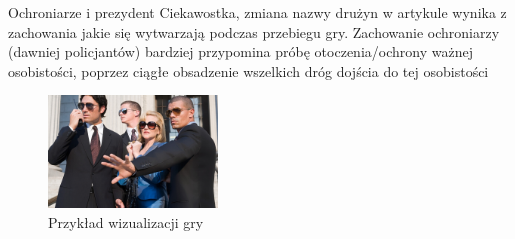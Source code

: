 \documentclass[polish]{beamer}
\begin{document}
\begin{frame}{Ochroniarze i prezydent}
    Ciekawostka, zmiana nazwy drużyn w artykule wynika z zachowania jakie się wytwarzają podczas przebiegu gry.
    Zachowanie ochroniarzy (dawniej policjantów) bardziej przypomina próbę otoczenia/ochrony ważnej osobistości,
    poprzez ciągłe obsadzenie wszelkich dróg dojścia do tej osobistości 
    \begin{figure}
        \centering
        \includegraphics[width=0.4\textwidth]{img/Celebrities-and-entertainers.jpg}
        \caption{Przykład wizualizacji gry}
        \label{fig:real_b_p}
    \end{figure}
\end{frame}
\end{document}

